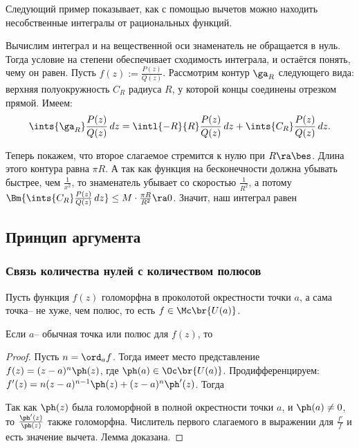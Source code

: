 \documentclass[a4paper]{article}
\def\mcomp#1{\mskip-10mu#1\mskip-10mu}
\begin{document}
Следующий пример показывает, как с помощью вычетов можно находить несобственные интегралы от рациональных функций.

\begin{ex}
Вычислим интеграл
и на вещественной оси знаменатель не обращается в нуль. Тогда условие на степени обеспечивает сходимость интеграла,
и остаётся понять, чему он равен. Пусть $f(z) := \frac{P(z)}{Q(z)}$. Рассмотрим контур $\ga_R$ следующего вида:
верхняя полуокружность $C_R$ радиуса $R$, у которой концы соединены отрезком прямой.  Имеем:
$$\ints{\ga_R}\frac{P(z)}{Q(z)}\,dz= \intl{-R}{R}\frac{P(z)}{Q(z)}\,dz+ \ints{C_R}\frac{P(z)}{Q(z)}\,dz.$$


Теперь покажем, что второе слагаемое стремится к нулю при $R \ra \bes$. Длина этого контура равна $\pi R$. А так как
функция на бесконечности должна убывать быстрее, чем $\frac{1}{x^2}$, то знаменатель убывает со скоростью $\frac{1}{R^2}$,
а потому $\Bm{\ints{C_R}\frac{P(z)}{Q(z)}\,dz} \le M \cdot \frac{\pi R}{R^2} \ra 0$.
Значит, наш интеграл равен
\eqn{I = 2\pi i \mcomp{\sums{\Img a_i > 0}} \res_{a_i} f.}
\end{ex}

\subsection{Принцип аргумента}

\subsubsection{Связь количества нулей с количеством полюсов}

Пусть функция $f(z)$ голоморфна в проколотой окрестности точки $a$, а сама точка-- не хуже, чем полюс, то есть $f \in \Mc\br{U(a)}$.

\begin{lemma}
Если $a$-- обычная точка или полюс для $f(z)$, то
\end{lemma}
\begin{proof}
Пусть $n = \ord_a f$. Тогда имеет место представление $f(z) = (z-a)^n \ph(z)$, где $\ph(a) \in \Oc\br{U(a)}$.
Продифференцируем: $f'(z)=n(z-a)^{n-1}\ph(z)+(z-a)^{n}\ph'(z)$. Тогда

Так как $\ph(z)$ была голоморфной в полной окрестности точки $a$, и $\ph(a) \neq 0$, то $\frac{\ph'(z)}{\ph(z)}$
также голоморфна. Числитель первого слагаемого в выражении для $\frac{f'}{f}$ и есть значение вычета. Лемма доказана.
\end{proof}
\end{document}
